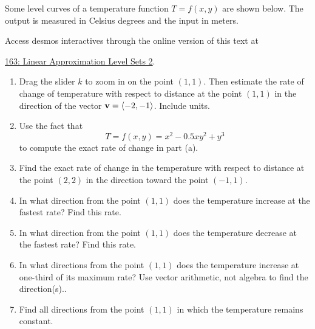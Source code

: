 \documentclass{ximera}
\begin{document}
\begin{question} \label{Qdlf3r3r3}

Some level curves of a temperature function $T = f(x,y)$ are shown below. The output is measured in Celsius degrees and the input in meters.


\begin{onlineOnly}
    \begin{center}
\end{center}
\end{onlineOnly}

Access desmos interactives through the online version of this text at
 
\href{https://www.desmos.com/calculator/s1u2zdsq99}{163: Linear Approximation Level Sets 2}.

\begin{enumerate}
\item Drag the slider $k$ to zoom in on the point $(1,1)$. Then estimate the rate of change of temperature with respect to distance at the point $(1,1)$ in the direction of the vector ${\bf v}=\langle -2, -1 \rangle$. Include units.

\item Use the fact that 
\[
  T  = f\left(x,y\right)=x^{2}-0.5xy^{2}+y^{3}
\]
to compute the exact rate of change in part (a).

\item Find the exact rate of change in the temperature with respect to distance at the point $(2,2)$ in the direction toward the point $(-1,1)$.

\item In what direction from the point $(1,1)$ does the temperature increase at the fastest rate? Find this rate.

\item In what direction from the point $(1,1)$ does the temperature decrease at the fastest rate? Find this rate.

\item In what directions from the point $(1,1)$ does the temperature increase at one-third of its maximum rate? Use vector arithmetic, not algebra to find the direction(s)..

\item Find all directions from the point $(1,1)$ in which the  temperature remains constant.
\end{enumerate}

\end{question}
\end{document}

